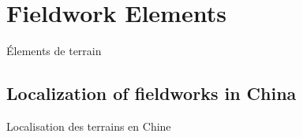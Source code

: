 



\newpage

\section{Fieldwork Elements}{Élements de terrain}

\label{app:sec:qualitative}



\subsection{Localization of fieldworks in China}{Localisation des terrains en Chine}


